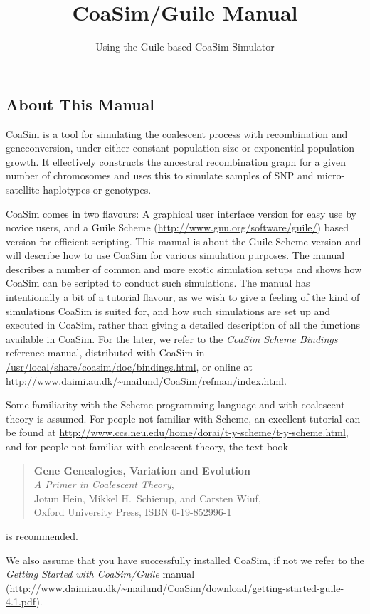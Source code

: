 \documentclass{manual}
\title{CoaSim/Guile Manual}
\subtitle{Using the Guile-based CoaSim Simulator}
\begin{document}
\begin{empfile}


\section{About This Manual}
\label{sec:about-this-manual}

CoaSim is a tool for simulating the coalescent process with
recombination and geneconversion, under either constant population
size or exponential population growth.  It effectively constructs the
ancestral recombination graph for a given number of chromosomes and
uses this to simulate samples of SNP and micro-satellite haplotypes or
genotypes.

CoaSim comes in two flavours: A graphical user interface version for
easy use by novice users, and a Guile Scheme
(\url{http://www.gnu.org/software/guile/}) based version for efficient
scripting.  This manual is about the Guile Scheme version and will
describe how to use CoaSim for various simulation purposes.  The
manual describes a number of common and more exotic simulation setups
and shows how CoaSim can be scripted to conduct such simulations.  The
manual has intentionally a bit of a tutorial flavour, as we wish to
give a feeling of the kind of simulations CoaSim is suited for, and
how such simulations are set up and executed in CoaSim, rather than
giving a detailed description of all the functions available in
CoaSim.  For the later, we refer to the \emph{CoaSim Scheme Bindings}
reference manual, distributed with CoaSim in
\url{/usr/local/share/coasim/doc/bindings.html}, or online at
\url{http://www.daimi.au.dk/~mailund/CoaSim/refman/index.html}.

Some familiarity with the Scheme programming language and with
coalescent theory is assumed.  For people not familiar with Scheme, an
excellent tutorial can be found at
\url{http://www.ccs.neu.edu/home/dorai/t-y-scheme/t-y-scheme.html},
and for people not familiar with coalescent theory, the text book
\begin{quote}
  \textbf{Gene Genealogies, Variation and Evolution}\\
  \textit{A Primer in Coalescent Theory},\\
  Jotun Hein, Mikkel H.\ Schierup, and Carsten Wiuf,\\
  Oxford University Press, ISBN 0-19-852996-1  
\end{quote}
is recommended.

We also assume that you have successfully installed CoaSim, if not we
refer to the \emph{Getting Started with CoaSim/Guile} manual
(\url{http://www.daimi.au.dk/~mailund/CoaSim/download/getting-started-guile-4.1.pdf}).



\end{empfile}
\end{document}
